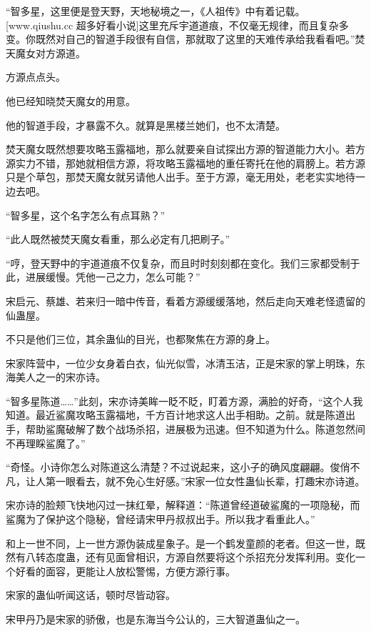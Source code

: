 
\begin{this_body}

“智多星，这里便是登天野，天地秘境之一，《人祖传》中有着记载。[www.qiushu.cc 超多好看小说]这里充斥宇道道痕，不仅毫无规律，而且复杂多变。你既然对自己的智道手段很有自信，那就取了这里的天难传承给我看看吧。”焚天魔女对方源道。

方源点点头。

他已经知晓焚天魔女的用意。

他的智道手段，才暴露不久。就算是黑楼兰她们，也不太清楚。

焚天魔女既然想要攻略玉露福地，那么就要亲自试探出方源的智道能力大小。若方源实力不错，那她就相信方源，将攻略玉露福地的重任寄托在他的肩膀上。若方源只是个草包，那焚天魔女就另请他人出手。至于方源，毫无用处，老老实实地待一边去吧。

“智多星，这个名字怎么有点耳熟？”

“此人既然被焚天魔女看重，那么必定有几把刷子。”

“哼，登天野中的宇道道痕不仅复杂，而且时时刻刻都在变化。我们三家都受制于此，进展缓慢。凭他一己之力，怎么可能？”

宋启元、蔡雄、若来归一暗中传音，看着方源缓缓落地，然后走向天难老怪遗留的仙蛊屋。

不只是他们三位，其余蛊仙的目光，也都聚焦在方源的身上。

宋家阵营中，一位少女身着白衣，仙光似雪，冰清玉洁，正是宋家的掌上明珠，东海美人之一的宋亦诗。

“智多星陈道……”此刻，宋亦诗美眸一眨不眨，盯着方源，满脸的好奇，“这个人我知道。最近鲨魔攻略玉露福地，千方百计地求这人出手相助。之前。就是陈道出手，帮助鲨魔破解了数个战场杀招，进展极为迅速。但不知道为什么。陈道忽然间不再理睬鲨魔了。”

“奇怪。小诗你怎么对陈道这么清楚？不过说起来，这小子的确风度翩翩。俊俏不凡，让人第一眼看去，就不免心生好感。”宋家一位女性蛊仙长辈，打趣宋亦诗道。

宋亦诗的脸颊飞快地闪过一抹红晕，解释道：“陈道曾经道破鲨魔的一项隐秘，而鲨魔为了保护这个隐秘，曾经请宋甲丹叔叔出手。所以我才看重此人。”

和上一世不同，上一世方源伪装成星象子。是一个鹤发童颜的老者。但这一世，既然有八转态度蛊，还有见面曾相识，方源自然要将这个杀招充分发挥利用。变化一个好看的面容，更能让人放松警惕，方便方源行事。

宋家的蛊仙听闻这话，顿时尽皆动容。

宋甲丹乃是宋家的骄傲，也是东海当今公认的，三大智道蛊仙之一。


\end{this_body}
